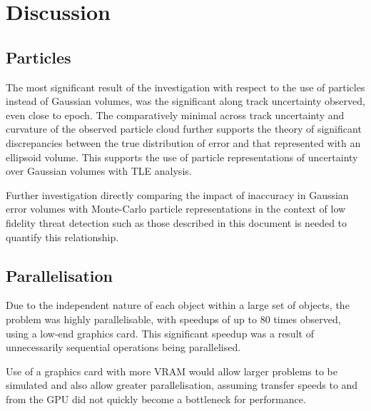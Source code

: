 \documentclass[12pt,openany,a4paper]{book}
\newcommand{\tab}[1]  {Table~\ref{#1}}		%
\begin{document}
		

%	
	

	
	\chapter{Discussion}
	
	\section{Particles}
	The most significant result of the investigation with respect to the use of particles instead of Gaussian volumes, was the significant along track uncertainty observed, even close to epoch. The comparatively minimal across track uncertainty and curvature of the observed particle cloud further supports the theory of significant discrepancies between the true distribution of error and that represented with an ellipsoid volume. This supports the use of particle representations of uncertainty over Gaussian volumes with TLE analysis. \newline
	
	Further investigation directly comparing the impact of inaccuracy in Gaussian error volumes with Monte-Carlo particle representations in the context of low fidelity threat detection such as those described in this document is needed to quantify this relationship.
	
	\section{Parallelisation}
	
	Due to the independent nature of each object within a large set of objects, the problem was highly parallelisable, with speedups of up to 80 times observed, using a low-end graphics card. This significant speedup was a result of unnecessarily sequential operations being parallelised. \newline
	
	Use of a graphics card with more VRAM would allow larger problems to be simulated and also allow greater parallelisation, assuming transfer speeds to and from the GPU did not quickly become a bottleneck for performance. \newline
	
\end{document}
